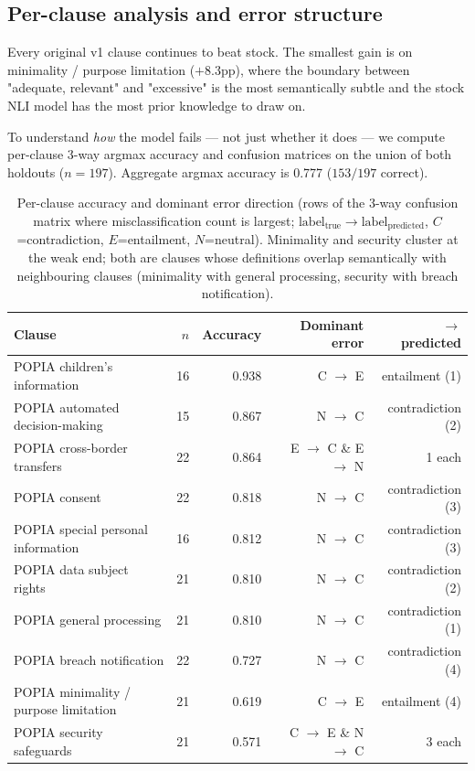 \documentclass[11pt]{article}
\begin{document}
\subsection{Per-clause analysis and error structure}
\label{sec:error-analysis}

Every original v1 clause continues to beat stock. The smallest gain is on minimality / purpose limitation ($+8.3$pp), where the boundary between "adequate, relevant" and "excessive" is the most semantically subtle and the stock NLI model has the most prior knowledge to draw on.

To understand \emph{how} the model fails — not just whether it does — we compute per-clause 3-way argmax accuracy and confusion matrices on the union of both holdouts ($n=197$). Aggregate argmax accuracy is 0.777 ($153/197$ correct).

\begin{table}[h]
\centering
\small
\begin{tabular}{lrrrr}
\toprule
Clause & $n$ & Accuracy & Dominant error & $\to$ predicted \\
\midrule
POPIA children's information         & 16 & 0.938 & C $\to$ E & entailment (1) \\
POPIA automated decision-making      & 15 & 0.867 & N $\to$ C & contradiction (2) \\
POPIA cross-border transfers         & 22 & 0.864 & E $\to$ C \& E $\to$ N & 1 each \\
POPIA consent                        & 22 & 0.818 & N $\to$ C & contradiction (3) \\
POPIA special personal information   & 16 & 0.812 & N $\to$ C & contradiction (3) \\
POPIA data subject rights            & 21 & 0.810 & N $\to$ C & contradiction (2) \\
POPIA general processing             & 21 & 0.810 & N $\to$ C & contradiction (1) \\
POPIA breach notification            & 22 & 0.727 & N $\to$ C & contradiction (4) \\
POPIA minimality / purpose limitation & 21 & 0.619 & C $\to$ E & entailment (4) \\
POPIA security safeguards            & 21 & 0.571 & C $\to$ E \& N $\to$ C & 3 each \\
\bottomrule
\end{tabular}
\caption{Per-clause accuracy and dominant error direction (rows of the 3-way confusion matrix where misclassification count is largest; $\text{label}_\text{true} \to \text{label}_\text{predicted}$, $C$=contradiction, $E$=entailment, $N$=neutral). Minimality and security cluster at the weak end; both are clauses whose definitions overlap semantically with neighbouring clauses (minimality with general processing, security with breach notification).}
\end{table}
\end{document}
